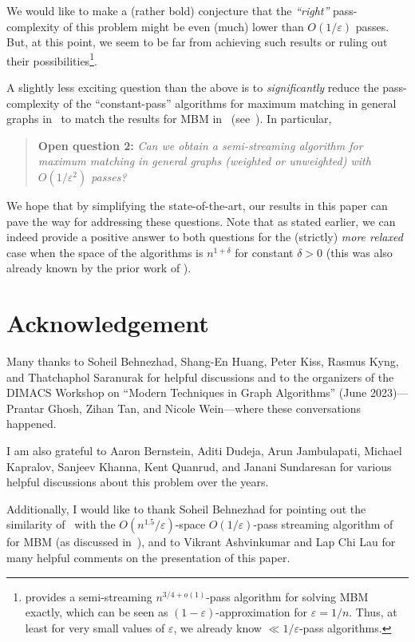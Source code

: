 \documentclass{article}
\newcommand{\eps}{\varepsilon}
\begin{document}
We would like to make a (rather bold) conjecture that the \emph{``right''} pass-complexity of this problem might be even (much) lower than $O(1/\eps)$ passes. But, at this point, we seem to be 
far from achieving such results or ruling out their possibilities\footnote{\cite{AssadiJJST22} provides a semi-streaming $n^{3/4+o(1)}$-pass algorithm for solving MBM exactly, which can be seen as $(1-\eps)$-approximation for $\eps=1/n$. Thus, 
at least for  very small values of $\eps$, we already know $\ll 1/\eps$-pass algorithms.}.  

A slightly less exciting question than the above is to \emph{significantly} reduce the pass-complexity of the ``constant-pass'' algorithms for maximum matching in general graphs
in~\cite{FischerMU22,HuangS23} to match the results for MBM in~\cite{AssadiLT21} (see~).  
In particular,  
\begin{quote}
	\textbf{Open question 2:} \emph{Can we obtain a semi-streaming algorithm for maximum matching in general graphs (weighted or unweighted) with $O(1/\eps^2)$ passes?}
\end{quote}

We hope that by simplifying the state-of-the-art, our results in this paper can pave the way for addressing these questions. Note that as stated earlier, we can indeed provide a positive answer to both questions for the (strictly) \emph{more relaxed}
case when the space of the algorithms is  $n^{1+\delta}$ for  constant $\delta > 0$ (this was also already known by the prior work of \cite{AhnG15}). 



\section*{Acknowledgement} 

Many thanks to Soheil Behnezhad, Shang-En Huang, Peter Kiss, Rasmus Kyng, and Thatchaphol Saranurak for helpful discussions and to
the organizers of the DIMACS Workshop on ``Modern Techniques in Graph Algorithms'' (June 2023)---Prantar Ghosh, Zihan Tan, and Nicole Wein---where these conversations happened. 

I am also grateful to Aaron Bernstein, Aditi Dudeja, Arun Jambulapati, Michael Kapralov, Sanjeev Khanna, Kent Quanrud, and Janani Sundaresan for various helpful discussions about this problem over the years. 

Additionally, I would like to thank Soheil Behnezhad for pointing out the similarity of~ with the $O(n^{1.5}/\eps)$-space $O(1/\eps)$-pass streaming algorithm of~\cite{BehnezhadDETY17} for MBM (as discussed in~),
and to Vikrant Ashvinkumar and Lap Chi Lau for many helpful comments on the presentation of this paper. 
 
\end{document}
